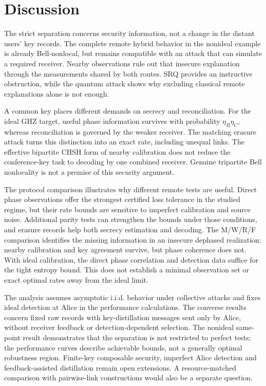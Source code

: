 \documentclass[aps,10pt,onecolumn,prx,superscriptaddress,longbibliography,nofootinbib]{revtex4-2}
\begin{document}
\section{Discussion}\label{sec:discussion}

The strict separation concerns security information, not a change in the distant users' key records. The complete remote hybrid behavior in the nonideal example is already Bell-nonlocal, but remains compatible with an attack that can simulate a required receiver. Nearby observations rule out that insecure explanation through the measurements shared by both routes. SRQ provides an instructive obstruction, while the quantum attack shows why excluding classical remote explanations alone is not enough.

A common key places different demands on secrecy and reconciliation. For the ideal GHZ target, useful phase information survives with probability \(\eta_B\eta_C\), whereas reconciliation is governed by the weaker receiver. The matching erasure attack turns this distinction into an exact rate, including unequal links. The effective bipartite CHSH form of nearby calibration does not reduce the conference-key task to decoding by one combined receiver. Genuine tripartite Bell nonlocality is not a premise of this security argument.

The protocol comparison illustrates why different remote tests are useful. Direct phase observations offer the strongest certified loss tolerance in the studied regime, but their rate bounds are sensitive to imperfect calibration and source noise. Additional parity tests can strengthen the bounds under those conditions, and erasure records help both secrecy estimation and decoding. The M/W/R/F comparison identifies the missing information in an insecure dephased realization: nearby calibration and key agreement survive, but phase coherence does not. With ideal calibration, the direct phase correlation and detection data suffice for the tight entropy bound. This does not establish a minimal observation set or exact optimal rates away from the ideal limit.

The analysis assumes asymptotic i.i.d. behavior under collective attacks and fixes ideal detection at Alice in the performance calculations. The converse results concern fixed raw records with key-distillation messages sent only by Alice, without receiver feedback or detection-dependent selection. The nonideal same-point result demonstrates that the separation is not restricted to perfect tests; the performance curves describe achievable bounds, not a generally optimal robustness region. Finite-key composable security, imperfect Alice detection and feedback-assisted distillation remain open extensions. A resource-matched comparison with pairwise-link constructions would also be a separate question.
\end{document}
